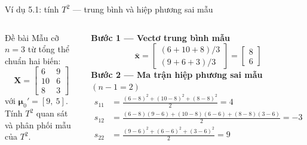 \begin{frame}{Ví dụ 5.1: tính \texorpdfstring{\(T^2\)}{T2} --- trung bình và hiệp phương sai mẫu}
  \begin{columns}[T,onlytextwidth]
    \begin{exampleblock}{Đề bài}
      Mẫu cỡ \(n=3\) từ tổng thể chuẩn hai biến:
      \[
        \mathbf{X} =
        \begin{bmatrix}
          6 & 9 \\ 10 & 6 \\ 8 & 3
        \end{bmatrix}
      \]
      với \(\boldsymbol{\mu}_0' = [9,\ 5]\). Tính \(T^2\) quan sát và phân phối mẫu của \(T^2\).
    \end{exampleblock}

    \small
    \textbf{Bước 1 --- Vectơ trung bình mẫu}
    \[
      \bar{\mathbf{x}}
      = \begin{bmatrix} (6+10+8)/3 \\ (9+6+3)/3 \end{bmatrix}
      = \begin{bmatrix} 8 \\ 6 \end{bmatrix}
    \]
    \textbf{Bước 2 --- Ma trận hiệp phương sai mẫu} \((n-1=2)\)
    \vspace{-0.1cm}
    \begin{align*}
      s_{11} &= \frac{(6-8)^2+(10-8)^2+(8-8)^2}{2} = 4\\
      s_{12} &= \frac{(6-8)(9-6)+(10-8)(6-6)+(8-8)(3-6)}{2} = -3\\
      s_{22} &= \frac{(9-6)^2+(6-6)^2+(3-6)^2}{2} = 9
    \end{align*}
  \end{columns}
\end{frame}

